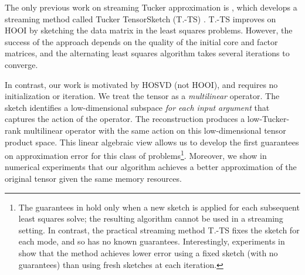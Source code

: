 
The only previous work on streaming Tucker approximation is \cite{malik2018low},
which develops a streaming method called Tucker TensorSketch (T.-TS) \cite[Algorithm 2]{malik2018low}.
T.-TS improves on HOOI by sketching the data matrix in the least squares problems.
However, the success of the approach depends on the quality of the initial
core and factor matrices, and the alternating least squares algorithm takes
several iterations to converge.

In contrast, our work is motivated by HOSVD (not HOOI),
and requires no initialization or iteration.
We treat the tensor as a \emph{multilinear} operator.
The sketch identifies a low-dimensional subspace \emph{for each input argument}
that captures the action of the operator.
The reconstruction produces a low-Tucker-rank multilinear operator
with the same action on this low-dimensional tensor product space.
This linear algebraic view allows us to develop the
first guarantees on approximation error for this class of problems\footnote{
The guarantees in \cite{malik2018low} hold only when a new sketch is applied
for each subsequent least squares solve;
the resulting algorithm cannot be used in a streaming setting.
In contrast, the practical streaming method T.-TS fixes the sketch for each mode,
and so has no known guarantees.
Interestingly, experiments in \cite{malik2018low} show that the method achieves
lower error using a fixed sketch (with no guarantees) than using fresh sketches at each iteration.
}.
Moreover, we show in numerical experiments that
our algorithm achieves a better approximation of the original tensor given the same memory resources.

